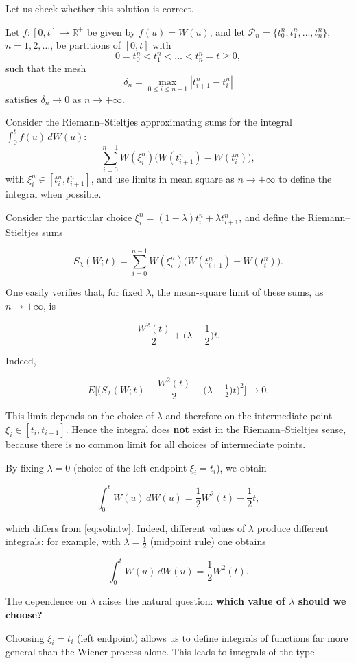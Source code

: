 \documentclass[
  11pt,
  a4paper,
]{book}
\theoremstyle{definition}
\theoremstyle{definition}
\theoremstyle{definition}
\theoremstyle{definition}
\theoremstyle{remark}
\begin{document}
Let us check whether this solution is correct.

Let \(f:[0,t]\to\mathbb{R}^+\) be given by \(f(u)=W(u)\), and let \(\mathcal{P}_n=\{t_0^n,t_1^n,\dots,t_n^n\}\), \(n=1,2,\dots\), be partitions of \([0,t]\) with
\[
0=t_0^n < t_1^n < \dots < t_n^n = t \ge 0,
\]
such that the mesh
\[
\delta_n = \max_{0\le i\le n-1} |t_{i+1}^n - t_i^n|
\]
satisfies \(\delta_n \to 0\) as \(n\to+\infty\).

Consider the Riemann--Stieltjes approximating sums for the integral \(\int_0^t f(u)\,dW(u)\):
\[
\sum_{i=0}^{n-1} W(\xi_i^n)\big(W(t_{i+1}^n)-W(t_i^n)\big),
\]
with \(\xi_i^n\in[t_i^n,t_{i+1}^n]\), and use limits in mean square as \(n\to+\infty\) to define the integral when possible.

Consider the particular choice \(\xi_i^n = (1-\lambda)t_i^n + \lambda t_{i+1}^n\), and define the Riemann--Stieltjes sums

\[
S_\lambda(W;t) = \sum_{i=0}^{n-1} W(\xi_i^n)\big(W(t_{i+1}^n)-W(t_i^n)\big).
\]

One easily verifies that, for fixed \(\lambda\), the mean-square limit of these sums, as \(n\to+\infty\), is

\[
\frac{W^2(t)}{2} + \Big(\lambda - \frac{1}{2}\Big)t.
\]

Indeed,

\[
E\Big[\Big(S_\lambda(W;t) - \frac{W^2(t)}{2} - \big(\lambda - \tfrac{1}{2}\big)t\Big)^2\Big] \longrightarrow 0.
\]

This limit depends on the choice of \(\lambda\) and therefore on the intermediate point \(\xi_i\in[t_i,t_{i+1}]\). Hence the integral does \textbf{not} exist in the Riemann--Stieltjes sense, because there is no common limit for all choices of intermediate points.

By fixing \(\lambda=0\) (choice of the left endpoint \(\xi_i=t_i\)), we obtain

\[
\int_0^t W(u)\,dW(u) = \frac{1}{2}W^2(t) - \frac{1}{2}t,
\]

which differs from \eqref{eq:solintw}. Indeed, different values of \(\lambda\) produce different integrals: for example, with \(\lambda=\tfrac{1}{2}\) (midpoint rule) one obtains

\[
\int_0^t W(u)\,dW(u) = \frac{1}{2}W^2(t).
\]

The dependence on \(\lambda\) raises the natural question: \textbf{which value of \(\lambda\) should we choose?}

Choosing \(\xi_i=t_i\) (left endpoint) allows us to define integrals of functions far more general than the Wiener process alone. This leads to integrals of the type
\end{document}

